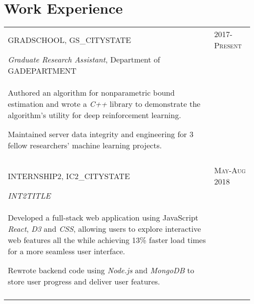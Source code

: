 \documentclass[a4paper,10pt]{article}
\begin{document}
\section{Work Experience}
\begin{supertabular}{p{13.9cm}>{\raggedleft\arraybackslash}p{3.4cm}}
	\textsc{GRADSCHOOL}, GS_CITYSTATE
	& \textsc{2017-Present} \\

	\small	\emph{Graduate Research Assistant}, \small Department of GADEPARTMENT & \\
	\begin{enumerate*}[label =$\circ$,itemjoin={\newline}]
		\item \footnotesize Authored an algorithm for nonparametric bound estimation and wrote a \emph{C++} library to demonstrate the algorithm's utility for deep reinforcement learning.
		\item \footnotesize Maintained server data integrity and engineering for 3 fellow researchers' machine learning projects.
	\end{enumerate*} & \\


	 \\

	\textsc{INTERNSHIP2}, IC2_CITYSTATE
	& \textsc{May-Aug 2018} \\
	\small	\emph{INT2TITLE} & \\
	\begin{enumerate*}[label =$\circ$, itemjoin={\newline}]
		\item \footnotesize Developed a full-stack web application using JavaScript \emph{React}, \emph{D3} and \emph{CSS}, allowing users to explore interactive web features all the while achieving 13\% faster load times for a more seamless user interface.
    \item \footnotesize Rewrote backend code using \emph{Node.js} and \emph{MongoDB} to store user progress and deliver user features.
	\end{enumerate*} & \\
	 \\



\end{supertabular}
\end{document}
